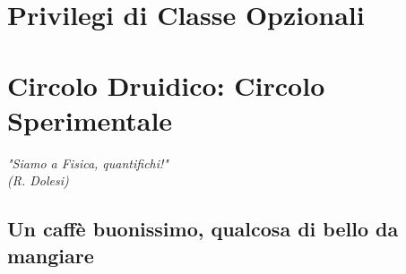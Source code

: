 
\section{Privilegi di Classe Opzionali}

\section{Circolo Druidico: Circolo Sperimentale}

\begin{DndReadAloud}
  \it
  "Siamo a Fisica, quantifichi!" \\ (R. Dolesi)
\end{DndReadAloud}

\subsection{Un caffè buonissimo, qualcosa di bello da mangiare}
